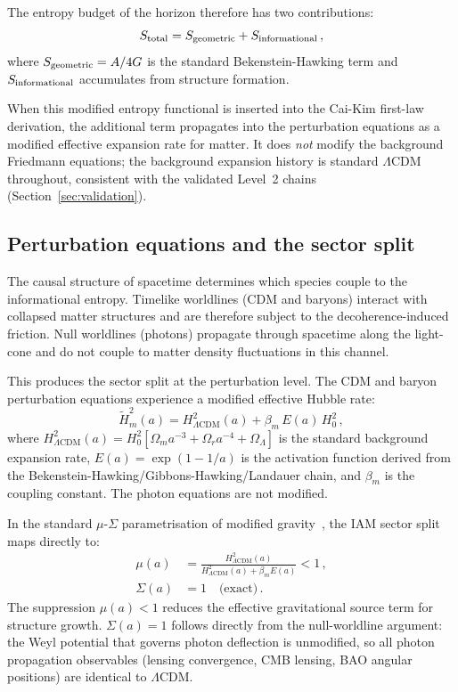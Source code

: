 \documentclass[12pt,a4paper]{article}
\newcommand{\lcdm}{$\Lambda$CDM}
\newcommand{\Lcdm}{\Lambda\text{CDM}}
\begin{document}
The entropy budget of the horizon therefore has two contributions:
\begin{equation}
S_{\rm total} = S_{\rm geometric} + S_{\rm informational} \,,
\label{eq:entropy}
\end{equation}
where $S_{\rm geometric} = A/4G$ is the standard Bekenstein-Hawking term
and $S_{\rm informational}$ accumulates from structure formation.

When this modified entropy functional is inserted into the Cai-Kim first-law
derivation, the additional term propagates into the perturbation equations
as a modified effective expansion rate for matter.
It does \emph{not} modify the background Friedmann equations; the background
expansion history is standard \lcdm{} throughout, consistent with the
validated Level~2 chains (Section~\ref{sec:validation}).

\subsection{Perturbation equations and the sector split}
\label{sec:perturb}

The causal structure of spacetime determines which species couple to the
informational entropy.
Timelike worldlines (CDM and baryons) interact with collapsed matter
structures and are therefore subject to the decoherence-induced friction.
Null worldlines (photons) propagate through spacetime along the light-cone
and do not couple to matter density fluctuations in this channel.

This produces the sector split at the perturbation level.
The CDM and baryon perturbation equations experience a modified effective
Hubble rate:
\begin{equation}
\tilde{H}_m^2(a) = H_{\Lcdm}^2(a)
                 + \beta_m \, E(a) \, H_0^2 \,,
\label{eq:hm}
\end{equation}
where $H_{\Lcdm}^2(a) = H_0^2[\Omega_m a^{-3} + \Omega_r a^{-4} + \Omega_\Lambda]$
is the standard background expansion rate,
$E(a) = \exp(1 - 1/a)$ is the activation function derived from the
Bekenstein-Hawking/Gibbons-Hawking/Landauer chain, and $\beta_m$ is the
coupling constant.
The photon equations are not modified.

In the standard $\mu$-$\Sigma$ parametrisation of modified
gravity~\citep{Pogosian2016}, the IAM sector split maps directly to:
\begin{align}
\mu(a) &= \frac{H_{\Lcdm}^2(a)}{H_{\Lcdm}^2(a) + \beta_m E(a)} < 1 \,,
\label{eq:mu} \\[4pt]
\Sigma(a) &= 1 \quad \text{(exact)} \,.
\label{eq:sigma}
\end{align}
The suppression $\mu(a) < 1$ reduces the effective gravitational source
term for structure growth.
$\Sigma(a) = 1$ follows directly from the null-worldline argument: the
Weyl potential that governs photon deflection is unmodified, so all photon
propagation observables (lensing convergence, CMB lensing, BAO angular
positions) are identical to \lcdm.
\end{document}
